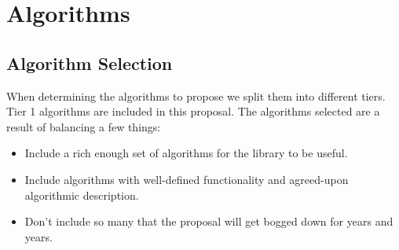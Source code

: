 \chapter{Algorithms}

\section{Algorithm Selection} \label{other_algo}

When determining the algorithms to propose we split them into different tiers. Tier 1 algorithms are included
in this proposal. The algorithms selected are a result of balancing a few things:
\begin{itemdescr}
\begin{itemize}
      \item Include a rich enough set of algorithms for the library to be useful.
      \item Include algorithms with well-defined functionality and agreed-upon algorithmic description.
      \item Don't include so many that the proposal will get bogged down for years and years.
\end{itemize}
\end{itemdescr}


